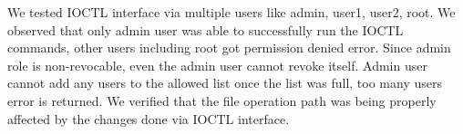 We tested IOCTL interface via multiple users like admin, user1, user2,
root.  We observed that only admin user was able to successfully run
the IOCTL commands, other users including root got permission denied
error.  Since admin role is non-revocable, even the admin user cannot
revoke itself.  Admin user cannot add any users to the allowed list
once the list was full, too many users error is returned.  We verified
that the file operation path was being properly affected by the
changes done via IOCTL interface.

